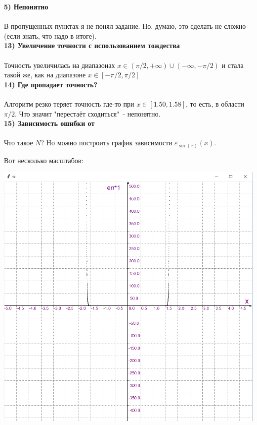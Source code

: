 \documentclass[12pt,a4paper]{scrartcl}
\begin{document}
		\textbf{5) Непонятно} \\ \\
			В пропущенных пунктах я не понял задание. Но, думаю, это сделать не сложно (если знать, что надо в итоге). \\
			
		\textbf{13) Увеличение точности с использованием тождества }  \\ \\
			
			
			Точность увеличилась на диапазонах $x \in (\pi/2, +\infty) \cup (-\infty, -\pi/2)$ и стала такой же, как на диапазоне $x \in [-\pi/2, \pi/2]$ \\
		
		\textbf{14) Где пропадает точность?} \\ \\
			
			
			Алгоритм резко теряет точность где-то при $x \in [1.50, 1.58] $, то есть, в области $\pi/2$. Что значит "перестаёт сходиться"\ - непонятно. \\
			
		\textbf{15) Зависимость ошибки от}  \\ \\
		
		Что такое $N$? Но можно построить график зависимости $\varepsilon_{\sin(x)} (x)$.
		
		
		
		Вот несколько масштабов:
		
		\includegraphics[width=\linewidth]{graph1}
		
\end{document}
